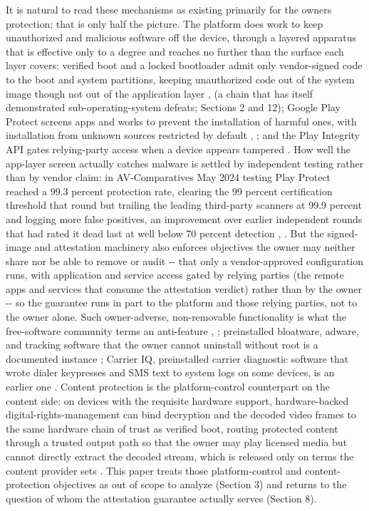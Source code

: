 \documentclass[
]{article}
\begin{document}
It is natural to read these mechanisms as existing primarily for the
owner\textquotesingle s protection; that is only half the picture. The
platform does work to keep unauthorized and malicious software off the
device, through a layered apparatus that is effective only to a degree
and reaches no further than the surface each layer covers: verified boot
and a locked bootloader admit only vendor-signed code to the boot and
system partitions, keeping unauthorized code out of the system image
though not out of the application layer \citep{aosp-verified-boot},
\citep{aosp-bootloader-locking} (a chain that has itself demonstrated
sub-operating-system defeats; Sections 2 and 12); Google Play Protect
screens apps and works to prevent the installation of harmful ones, with
installation from unknown sources restricted by default
\citep{google-play-protect}, \citep{nistSP800124r2}; and the Play
Integrity API gates relying-party access when a device appears tampered
\citep{play-integrity-verdicts}. How well the app-layer screen actually
catches malware is settled by independent testing rather than by vendor
claim: in AV-Comparatives\textquotesingle{} May 2024 testing Play
Protect reached a 99.3 percent protection rate, clearing the 99 percent
certification threshold that round but trailing the leading third-party
scanners at 99.9 percent and logging more false positives, an
improvement over earlier independent rounds that had rated it dead last
at well below 70 percent detection \citep{avcomparatives-mobile-2024},
\citep{avtest-android-endurance-2018}. But the signed-image and
attestation machinery also enforces objectives the owner may neither
share nor be able to remove or audit -\/- that only a vendor-approved
configuration runs, with application and service access gated by relying
parties (the remote apps and services that consume the attestation
verdict) rather than by the owner \citep{play-integrity-verdicts} -\/-
so the guarantee runs in part to the platform and those relying parties,
not to the owner alone. Such owner-adverse, non-removable functionality
is what the free-software community terms an anti-feature
\citep{hill2007antifeatures}, \citep{fdroid-antifeatures}; preinstalled
bloatware, adware, and tracking software that the owner cannot uninstall
without root is a documented instance \citep{gamba2020preinstalled};
Carrier IQ, preinstalled carrier diagnostic software that wrote dialer
keypresses and SMS text to system logs on some devices, is an earlier
one \citep{eckersley-carrieriq}. Content protection is the
platform-control counterpart on the content side: on devices with the
requisite hardware support, hardware-backed digital-rights-management
can bind decryption and the decoded video frames to the same hardware
chain of trust as verified boot, routing protected content through a
trusted output path so that the owner may play licensed media but cannot
directly extract the decoded stream, which is released only on terms the
content provider sets \citep{aosp-drm}. This paper treats those
platform-control and content-protection objectives as out of scope to
analyze (Section 3) and returns to the question of whom the attestation
guarantee actually serves (Section 8).
\end{document}
